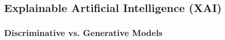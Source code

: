 











\subsection{Explainable Artificial Intelligence (XAI)} \label{ssec:xai}

\cite{Arieta2020}

\subsubsection{Discriminative vs. Generative Models} \label{sssec:disc_vs_gen}

